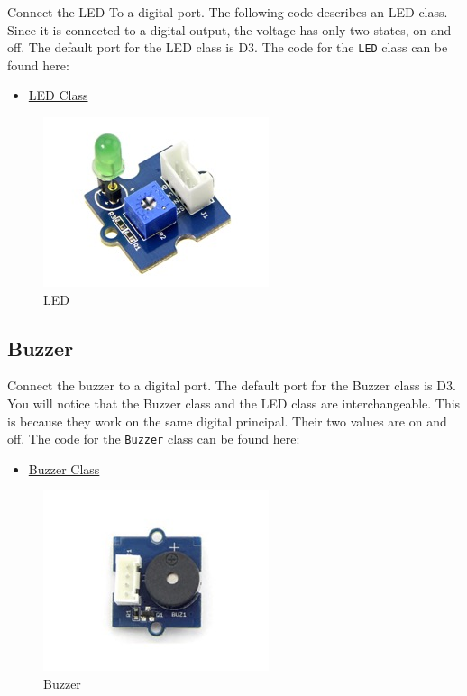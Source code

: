 Connect the LED To a digital port. The following code describes an LED
class. Since it is connected to a digital output, the voltage has only
two states, on and off. The default port for the LED class is D3. The
code for the \texttt{LED} class can be found here:

\begin{itemize}
\tightlist
\item
  \href{https://github.com/cloudmesh/cloudmesh.pi/blob/master/cloudmesh/pi/led.py}{LED
  Class}
\end{itemize}

\begin{figure}
\centering
\includegraphics{../images/grovepi/led.jpg}
\caption{LED}
\end{figure}

\subsection{Buzzer}\label{buzzer}

Connect the buzzer to a digital port. The default port for the Buzzer
class is D3. You will notice that the Buzzer class and the LED class are
interchangeable. This is because they work on the same digital
principal. Their two values are on and off. The code for the
\texttt{Buzzer} class can be found here:

\begin{itemize}
\tightlist
\item
  \href{https://github.com/cloudmesh/cloudmesh.pi/blob/master/cloudmesh/pi/buzzer.py}{Buzzer
  Class}
\end{itemize}

\begin{figure}
\centering
\includegraphics{../images/grovepi/buzzer.jpg}
\caption{Buzzer}
\end{figure}

